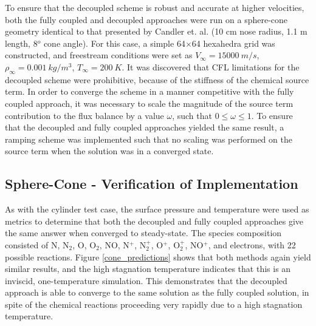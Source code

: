 To ensure that the decoupled scheme is robust and accurate at higher velocities, both the
fully coupled and decoupled approaches were run on a sphere-cone geometry
identical to that presented by Candler et. al. \cite{candler} (10 cm nose
radius, 1.1 m length, 8$^o$ cone angle).  For this case, a simple 64$\times$64
hexahedra grid was constructed, and freestream conditions were set as
$V_{\infty} = 15000\ m/s$, $\rho_{\infty}=0.001\ kg/m^3$, $T_\infty = 200\ K$.
It was discovered that CFL limitations for the decoupled scheme were
prohibitive, because of the stiffness of the chemical source term.  In order to
converge the scheme in a manner competitive with the fully coupled approach, it
was necessary to scale the magnitude of the source term contribution to the flux
balance by a value $\omega$, such that $0 \leq \omega \leq 1$.  To ensure that
the decoupled and fully coupled approaches yielded the same result, a ramping
scheme was implemented such that no scaling was performed on the source term
when the solution was in a converged state.

\subsection{Sphere-Cone - Verification of Implementation} 

As with the cylinder test case, the surface pressure and temperature were used
as metrics to determine that both the decoupled and fully coupled approaches
give the same answer when converged to steady-state. The species composition
consisted of N, $\text{N}_2$, O, $\text{O}_2$, NO, N$^+$, $\text{N}_2^+$, O$^+$,
$\text{O}_2^+$, NO$^+$, and electrons, with 22 possible reactions. Figure
\ref{cone_predictions} shows that both methods again yield similar results, and
the high stagnation temperature indicates that this is an inviscid,
one-temperature simulation.  This demonstrates that the decoupled approach is
able to converge to the same solution as the fully coupled solution, in spite of
the chemical reactions proceeding very rapidly due to a high stagnation
temperature.

